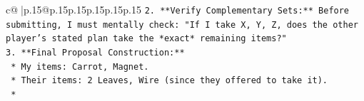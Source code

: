 \documentclass{article}
\begin{document}
{\begin{supertabular}{c@{$\;$}|p{.15\linewidth}@{}p{.15\linewidth}p{.15\linewidth}p{.15\linewidth}p{.15\linewidth}p{.15\linewidth}}
{{{\texttt{2.  **Verify Complementary Sets:** Before submitting, I must mentally check: "If I take X, Y, Z, does the other player's stated plan take the *exact* remaining items?"} \\
\texttt{3.  **Final Proposal Construction:**} \\
\texttt{    *   My items: Carrot, Magnet.} \\
\texttt{    *   Their items: 2 Leaves, Wire (since they offered to take it).} \\
\texttt{    *} \\
            }
        }
    }
     \\ \\

\end{supertabular}
}
\end{document}
